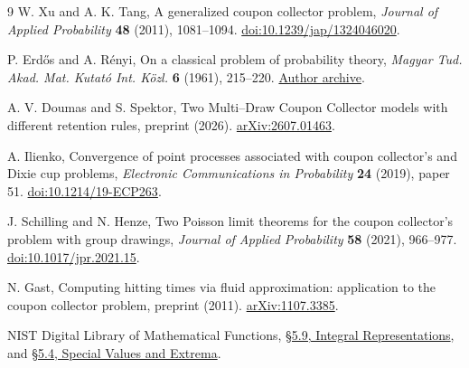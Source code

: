 \documentclass[11pt]{article}
\theoremstyle{remark}\newtheorem{remark}[theorem]{Remark}
\begin{document}
\begin{thebibliography}{9}
W. Xu and A. K. Tang,
A generalized coupon collector problem,
\emph{Journal of Applied Probability} \textbf{48} (2011), 1081--1094.
\href{https://doi.org/10.1239/jap/1324046020}{doi:10.1239/jap/1324046020}.

P. Erd\H{o}s and A. R\'enyi,
On a classical problem of probability theory,
\emph{Magyar Tud. Akad. Mat. Kutat\'o Int. K\"ozl.} \textbf{6} (1961), 215--220.
\href{https://static.renyi.hu/renyi_cikkek/1961_on_a_classical_problem_of_probability_theory.pdf}{Author archive}.

A. V. Doumas and S. Spektor,
Two Multi--Draw Coupon Collector models with different retention rules,
preprint (2026).
\href{https://arxiv.org/abs/2607.01463}{arXiv:2607.01463}.

A. Ilienko,
Convergence of point processes associated with coupon collector's and
Dixie cup problems,
\emph{Electronic Communications in Probability} \textbf{24} (2019), paper 51.
\href{https://doi.org/10.1214/19-ECP263}{doi:10.1214/19-ECP263}.

J. Schilling and N. Henze,
Two Poisson limit theorems for the coupon collector's problem with group drawings,
\emph{Journal of Applied Probability} \textbf{58} (2021), 966--977.
\href{https://doi.org/10.1017/jpr.2021.15}{doi:10.1017/jpr.2021.15}.

N. Gast,
Computing hitting times via fluid approximation: application to the coupon
collector problem, preprint (2011).
\href{https://arxiv.org/abs/1107.3385}{arXiv:1107.3385}.

NIST Digital Library of Mathematical Functions,
\href{https://dlmf.nist.gov/5.9}{\S5.9, Integral Representations}, and
\href{https://dlmf.nist.gov/5.4}{\S5.4, Special Values and Extrema}.
\end{thebibliography}
\end{document}
